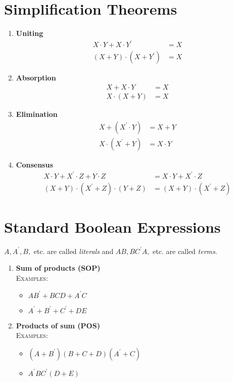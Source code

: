 \documentclass[oneside]{book}
\begin{document}
\section{Simplification Theorems}
\label{simplification_theorems_section}
\begin{enumerate}
	\item \textbf{Uniting}\\
	      \begin{align*}
		      X\cdot Y + X\cdot Y^\prime  & = X \\
		      (X + Y)\cdot (X + Y^\prime) & = X
	      \end{align*}
	      \label{uniting_theorem}
	\item \textbf{Absorption}\\
	      \begin{align*}
		      X+ X\cdot Y    & = X \\
		      X\cdot (X + Y) & = X
	      \end{align*}
	\item \textbf{Elimination}\\
	      \begin{align*}
		      X+ (X^\prime\cdot Y)  & = X + Y    \\
		      X\cdot (X^\prime + Y) & = X\cdot Y
	      \end{align*}
	\item \textbf{Consensus}\\
	      \begin{align*}
		      X\cdot Y+ X^\prime\cdot Z + Y\cdot Z     & = X\cdot Y + X^\prime \cdot Z  \\
		      (X + Y)\cdot (X^\prime + Z)\cdot (Y + Z) & =( X + Y )\cdot (X^\prime + Z)
	      \end{align*}
\end{enumerate}

\section{Standard Boolean Expressions}
$A, A^\prime, B, $ etc. are called \textit{literals} and $AB, BC^\prime A, $ etc. are called \textit{terms}.
\begin{enumerate}
	\item \textbf{Sum of products (SOP)}\\
	      \textsc{Examples}:
	      \begin{itemize}
		      \item $AB^\prime + BCD + A^\prime C$
		      \item $A^\prime + B^\prime + C^\prime + DE$
	      \end{itemize}
	\item \textbf{Products of sum (POS)}\\
	      \textsc{Examples}:
	      \begin{itemize}
		      \item $(A + B^\prime)(B + C + D)(A^\prime + C)$
		      \item $A^\prime B C^\prime (D + E)$
	      \end{itemize}
\end{enumerate}
\end{document}
